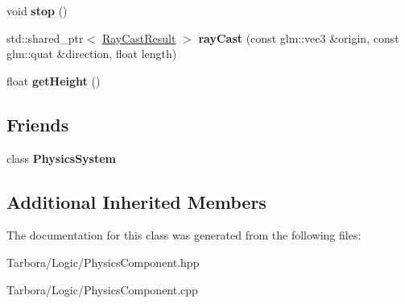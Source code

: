 \begin{DoxyCompactItemize}
void {\bfseries stop} ()
\item 
\mbox{\label{classTarbora_1_1PhysicsComponent_a022f79441052ce75ae1a1c2b29ed36cd}} 
std\+::shared\+\_\+ptr$<$ \hyperlink{structTarbora_1_1RayCastResult}{Ray\+Cast\+Result} $>$ {\bfseries ray\+Cast} (const glm\+::vec3 \&origin, const glm\+::quat \&direction, float length)
\item 
\mbox{\label{classTarbora_1_1PhysicsComponent_a3e7abcc1f30026b578a88c3ad826af10}} 
float {\bfseries get\+Height} ()
\end{DoxyCompactItemize}
\subsection*{Friends}
\begin{DoxyCompactItemize}
\item 
\mbox{\label{classTarbora_1_1PhysicsComponent_a6fb7520528fab4a670001f041b872bf2}} 
class {\bfseries Physics\+System}
\end{DoxyCompactItemize}
\subsection*{Additional Inherited Members}


The documentation for this class was generated from the following files\+:\begin{DoxyCompactItemize}
\item 
Tarbora/\+Logic/Physics\+Component.\+hpp\item 
Tarbora/\+Logic/Physics\+Component.\+cpp\end{DoxyCompactItemize}
